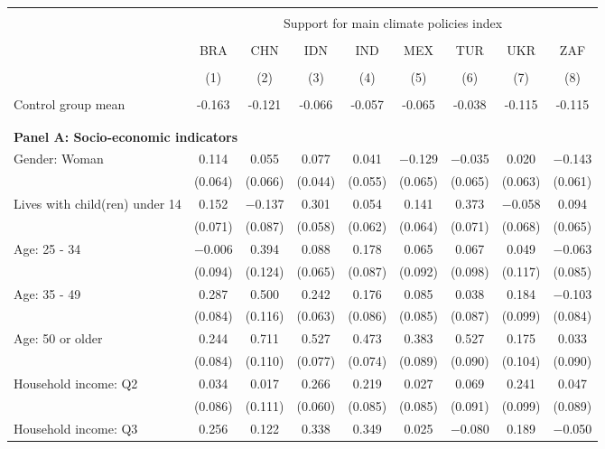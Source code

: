 
\begin{tabular}{@{\extracolsep{5pt}}lcccccccc} 
\\[-1.8ex]\hline 
\hline \\[-1.8ex] 
 & \multicolumn{8}{c}{Support for main climate policies index} \\ 
\cline{2-9} 
\\[-1.8ex] & BRA & CHN & IDN & IND & MEX & TUR & UKR & ZAF \\ 
\\[-1.8ex] & (1) & (2) & (3) & (4) & (5) & (6) & (7) & (8)\\ 
\hline \\[-1.8ex] 
Control group mean & -0.163 & -0.121 & -0.066 & -0.057 & -0.065 & -0.038 & -0.115 & -0.115   \\ \hline \\[-1.8ex]
\\[1ex]
\multicolumn{ 9 }{l}{\textbf{ Panel A: Socio-economic indicators }} \\
 Gender: Woman & 0.114 & 0.055 & 0.077 & 0.041 & $-$0.129 & $-$0.035 & 0.020 & $-$0.143 \\ 
  & (0.064) & (0.066) & (0.044) & (0.055) & (0.065) & (0.065) & (0.063) & (0.061) \\ 
  Lives with child(ren) under 14 & 0.152 & $-$0.137 & 0.301 & 0.054 & 0.141 & 0.373 & $-$0.058 & 0.094 \\ 
  & (0.071) & (0.087) & (0.058) & (0.062) & (0.064) & (0.071) & (0.068) & (0.065) \\ 
  Age: 25 - 34 & $-$0.006 & 0.394 & 0.088 & 0.178 & 0.065 & 0.067 & 0.049 & $-$0.063 \\ 
  & (0.094) & (0.124) & (0.065) & (0.087) & (0.092) & (0.098) & (0.117) & (0.085) \\ 
  Age: 35 - 49 & 0.287 & 0.500 & 0.242 & 0.176 & 0.085 & 0.038 & 0.184 & $-$0.103 \\ 
  & (0.084) & (0.116) & (0.063) & (0.086) & (0.085) & (0.087) & (0.099) & (0.084) \\ 
  Age: 50 or older & 0.244 & 0.711 & 0.527 & 0.473 & 0.383 & 0.527 & 0.175 & 0.033 \\ 
  & (0.084) & (0.110) & (0.077) & (0.074) & (0.089) & (0.090) & (0.104) & (0.090) \\ 
  Household income: Q2 & 0.034 & 0.017 & 0.266 & 0.219 & 0.027 & 0.069 & 0.241 & 0.047 \\ 
  & (0.086) & (0.111) & (0.060) & (0.085) & (0.085) & (0.091) & (0.099) & (0.089) \\ 
  Household income: Q3 & 0.256 & 0.122 & 0.338 & 0.349 & 0.025 & $-$0.080 & 0.189 & $-$0.050 \\ 

\end{tabular}

